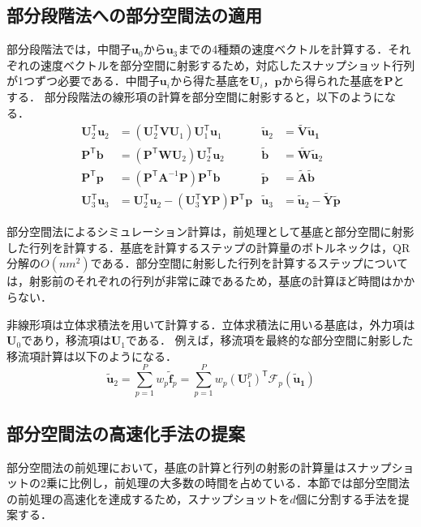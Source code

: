 \documentclass[uplatex,dvipdfmx,10pt,a4paper,notitlepage,oneside,twocolumn]{abst_jsarticle}
\begin{document}
\subsection{部分段階法への部分空間法の適用}
部分段階法では，中間子$\bm{u}_0$から$\bm{u}_3$までの4種類の速度ベクトルを計算する．それぞれの速度ベクトルを部分空間に射影するため，対応したスナップショット行列が1つずつ必要である．中間子$\bm{u}_i$から得た基底を$\bm{U}_i$，$\bm{p}$から得られた基底を$\bm{P}$とする．
部分段階法の線形項の計算を部分空間に射影すると，以下のようになる．
\begin{align*}
 \bm{U}_2^{\mathsf T}\bm{u}_2	& = (\bm{U}_2^{\mathsf T}\bm{V}\bm{U}_1)\bm{U}_1^{\mathsf T}\bm{u}_1 					&\bm{\widetilde{u}}_2 		&= \bm{\widetilde{V}}\bm{\widetilde{u}_1}	\\
 \bm{P}^{\mathsf T}\bm{b}		& = (\bm{P}^{\mathsf T}\bm{W}\bm{U}_2)\bm{U}_2^{\mathsf T}\bm{u}_2        				&\bm{\widetilde{b}}			&= \bm{\widetilde{W}}\bm{\widetilde{u}}_2	\\
 \bm{P}^{\mathsf T}\bm{p} 		&= (\bm{P}^{\mathsf T}\bm{A}^{-1}\bm{P})\bm{P}^{\mathsf T}\bm{b}						&\bm{\widetilde{p}}			&= \bm{\widetilde{A}}\bm{\widetilde{b}}\\
 \bm{U}_3^{\mathsf T}\bm{u}_3 	&=  \bm{U}_2^{\mathsf T}\bm{u}_2 - (\bm{U}_3^{\mathsf T}\bm{Y}\bm{P})\bm{P}^{\mathsf T}\bm{p}	&\bm{\widetilde{u}}_3		&= \bm{\widetilde{u}}_2  -  \bm{\widetilde{Y}}\bm{\widetilde{p}}
\end{align*}

部分空間法によるシミュレーション計算は，前処理として基底と部分空間に射影した行列を計算する．基底を計算するステップの計算量のボトルネックは，QR分解の$O(nm^2)$である．部分空間に射影した行列を計算するステップについては，射影前のそれぞれの行列が非常に疎であるため，基底の計算ほど時間はかからない．

非線形項は立体求積法を用いて計算する．立体求積法に用いる基底は，外力項は$\bm{U}_0$であり，移流項は$\bm{U}_1$である．
例えば，移流項を最終的な部分空間に射影した移流項計算は以下のようになる．
\[
	\bm{\widetilde{u}}_2 = \sum_{p=1}^Pw_p\bm{\widetilde{f}}_p =   \sum_{p=1}^Pw_p(\bm{U}^p_1)^{\mathsf T}\mathcal{F}_p(\bm{\widetilde{u}_1})
\]
\subsection{部分空間法の高速化手法の提案}
部分空間法の前処理において，基底の計算と行列の射影の計算量はスナップショットの$2$乗に比例し，前処理の大多数の時間を占めている．本節では部分空間法の前処理の高速化を達成するため，スナップショットを$d$個に分割する手法を提案する．
\end{document}
